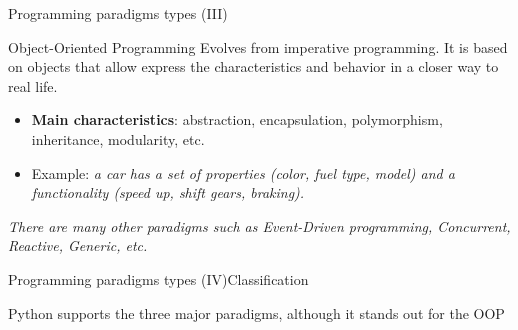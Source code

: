 \documentclass[10pt,compress]{beamer} %
\begin{document}
\begin{frame}{Programming paradigms types (III)}{}
	\begin{block}{Object-Oriented Programming}
		Evolves from imperative programming. It is based on \alert{objects} that allow express the \alert{characteristics} and \alert{behavior} in a closer way to real life. 
  	\end{block}
  	\begin{itemize}
  		\item \textbf{Main characteristics}: abstraction, encapsulation, polymorphism, inheritance, modularity, etc.
		\item Example: \textit{a car has a set of properties (color, fuel type, model) and a functionality (speed up, shift gears, braking).} 
  	\end{itemize}
  	
\textit{\alert{There are many other paradigms such as Event-Driven programming, Concurrent, Reactive, Generic, etc.}}
\end{frame}

	

\begin{frame}{Programming paradigms types (IV)}{Classification}

	\centering 


    \bigskip

	\centering Python supports the three major paradigms, although it stands out for the OOP
\end{frame}
\end{document}
